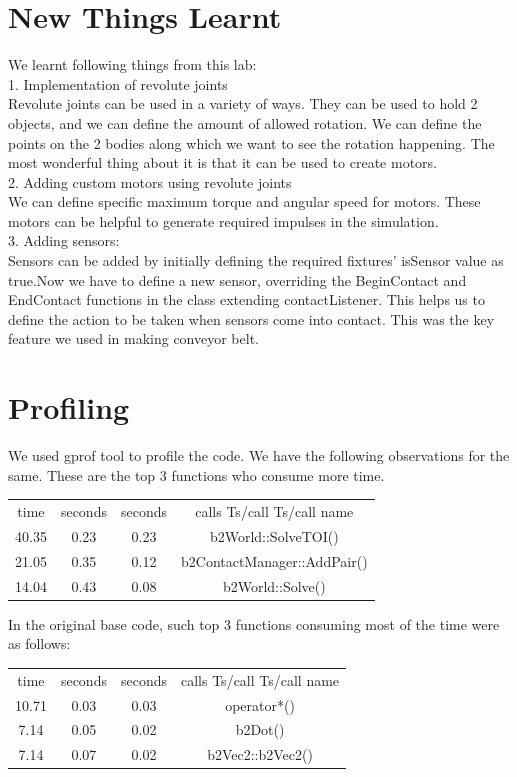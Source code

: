 \documentclass{report}
\begin{document}
\section{New Things Learnt}
We learnt following things from this lab:\\
1. Implementation of revolute joints\\
 	Revolute joints can be used in a variety of ways. They can be used to hold 2 objects, and we can define the amount of allowed rotation. We can define the points on the 2 bodies along which we want to see the rotation happening. The most wonderful thing about it is that it can be used to create motors.\\
2. Adding custom motors using revolute joints\\
 We can define specific maximum torque and angular speed for motors. These motors can be helpful to generate required impulses in the simulation.\\
3. Adding sensors:\\
	Sensors can be added by initially defining the required fixtures' isSensor value as true.Now we have to define a new sensor, overriding the BeginContact and EndContact functions in the class extending contactListener. This helps us to define the action to 
be taken when sensors come into contact. This was the key feature we used in making conveyor belt.\\
\newpage
\section{Profiling}
We used gprof tool to profile the code. We have the following observations for the same.
These are the top 3 functions who consume more time.

\begin{center}
\begin{tabular}{ ||c c c c|| } 
 \hline      
time & seconds & seconds & calls Ts/call Ts/call name  \\
40.35 & 0.23 & 0.23 & b2World::SolveTOI() \\
21.05 & 0.35 & 0.12 & b2ContactManager::AddPair() \\
14.04 & 0.43 & 0.08 & b2World::Solve() \\
 \hline
\end{tabular}
\end{center}
 
In the original base code, such top 3 functions consuming most of the time were as follows:
\begin{center}
\begin{tabular}{ ||c c c c|| } 
 \hline      
time & seconds & seconds & calls Ts/call Ts/call name  \\
10.71 & 0.03 & 0.03 & operator*() \\
7.14 &  0.05 & 0.02 & b2Dot() \\
7.14 & 0.07 & 0.02 & b2Vec2::b2Vec2() \\
 \hline
\end{tabular}
\end{center}
\end{document}
